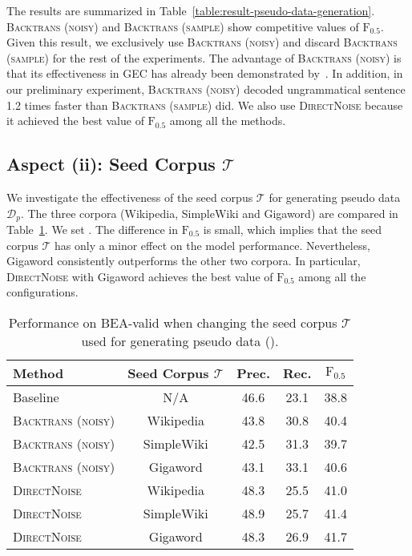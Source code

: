 \documentclass[11pt,a4paper]{article}
\newcommand{\backtrans}{\textsc{Backtrans (noisy)}}
\newcommand{\samplebacktrans}{\textsc{Backtrans (sample)}}
\newcommand{\directnoise}{\textsc{DirectNoise}}
\newcommand{\pseudodata}{\ensuremath{\mathcal{D}_{p}}}
\newcommand{\seedcorpus}{\ensuremath{\mathcal{T}}}
\newcommand{\fscore}{\ensuremath{\mathrm{F}_{0.5}}}
\begin{document}
The results are summarized in Table~\ref{table:result-pseudo-data-generation}.
\backtrans{} and \samplebacktrans{} show competitive values of \fscore{}.
Given this result, we exclusively use \backtrans{} and discard \samplebacktrans{} for the rest of the experiments.
The advantage of \backtrans{} is that its effectiveness in GEC has already been demonstrated by~\citet{xie:2018:NAACL}.
In addition, in our preliminary experiment, \backtrans{} decoded ungrammatical sentence 1.2 times faster than \samplebacktrans{} did.
We also use \directnoise{} because it achieved the best value of \fscore{} among all the methods.


\subsection{Aspect (ii): Seed Corpus \seedcorpus{}}
\label{subsec:source-of-pseudo-data}
We investigate the effectiveness of the seed corpus \seedcorpus{} for generating pseudo data \pseudodata{}.
The three corpora (Wikipedia, SimpleWiki and Gigaword) are compared in Table~\ref{table:result-data-source-for-pseudo}.
We set .
The difference in \fscore{} is small, which implies that the seed corpus \seedcorpus{} has only a minor effect on the model performance.
Nevertheless, Gigaword consistently outperforms the other two corpora.
In particular, \directnoise{} with Gigaword achieves the best value of \fscore{} among all the configurations.


\begin{table}[t!]
\centering
\small
\tabcolsep 1.5mm
\begin{tabular}{@{}lcccc@{}}
\toprule
Method           & Seed Corpus \seedcorpus{}  & Prec.  & Rec.  & \fscore{} \\
\midrule
Baseline         & N/A            &  46.6  &  23.1  &  38.8  \\
\midrule
\backtrans{}     & Wikipedia      &  43.8  &  30.8  &  40.4  \\
\backtrans{}     & SimpleWiki     &  42.5  &  31.3  &  39.7  \\
\backtrans{}     & Gigaword       &  43.1  &  33.1  &  40.6  \\
\midrule
\directnoise{}   & Wikipedia      &  48.3  &  25.5  &  41.0  \\
\directnoise{}   & SimpleWiki     &  48.9  &  25.7  &  41.4  \\
\directnoise{}   & Gigaword       &  48.3  &  26.9  &  41.7 \\
\bottomrule
\end{tabular}
\vskip -2mm
\caption{Performance on BEA-valid when changing the seed corpus \seedcorpus{} used for generating pseudo data ().}
\label{table:result-data-source-for-pseudo}
\end{table}
\end{document}

